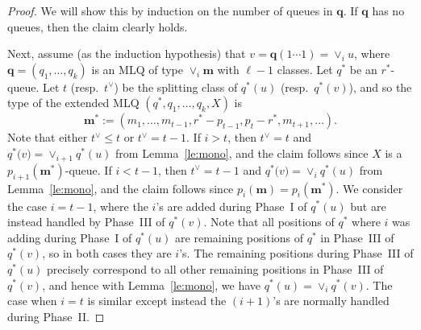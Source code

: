 \documentclass[reqno]{amsart}
\newcommand{\0}{\phantom{c}}
\newcommand{\merge}[1]{\vee_{#1}} %
\newcommand{\mm}{\mathbf{m}}
\newcommand{\qq}{\mathbf{q}}
\theoremstyle{plain}
\theoremstyle{definition}
\numberwithin{equation}{section}
\begin{document}
\begin{proof}
  We will show this by induction on the number of queues in $\qq$.
  If $\qq$ has no queues, then the claim clearly holds.
  
  Next, assume (as the induction hypothesis) that $v = \qq(1 \dotsm 1) = \merge{i} u$, where $\qq = (q_1, \dotsc, q_k)$ is an MLQ of type $\merge{i}\mm$ with $\ell - 1$ classes.
  Let $q^*$ be an $r^*$-queue. %
  Let $t$ (resp.~$t^{\vee}$) be the splitting class of $q^*(u)$ (resp.~$q^*(v)$), and so the type of the extended MLQ $(q^*, q_1, \dotsc, q_k, X)$ is
  \[
  \mm^* := (m_1, \dotsc, m_{t-1}, r^* - p_{t-1}, p_t - r^*, m_{t+1}, \ldots).
  \]
  Note that either $t^{\vee} \leq t$ or $t^{\vee} = t - 1$.
  If $i > t$, then $t^{\vee} = t$ and $q^*\bigl(v) = \merge{i+1} q^*(u)$ from Lemma~\ref{le:mono}, and the claim follows since $X$ is a $p_{i+1}(\mm^*)$-queue.
  If $i < t - 1$, then $t^{\vee} = t - 1$ and $q^*\bigl(v) = \merge{i} q^*(u)$ from Lemma~\ref{le:mono}, and the claim follows since $p_i(\mm) = p_i(\mm^*)$.
  We consider the case $i = t - 1$, where the $i$'s are added during Phase~I of $q^*(u)$ but are instead handled by Phase~III of $q^*(v)$.
  Note that all positions of $q^*$ where $i$ was adding during Phase~I of $q^*(u)$ are remaining positions of $q^*$ in Phase~III of $q^*(v)$, so in both cases they are $i$'s.
  The remaining positions during Phase~III of $q^*(u)$ precisely correspond to all other remaining positions in Phase~III of $q^*(v)$, and hence with Lemma~\ref{le:mono}, we have $q^*(u) = \merge{i} q^*(v)$.
  The case when $i = t$ is similar except instead the $(i+1)$'s are normally handled during Phase~II.
\end{proof}
\end{document}
